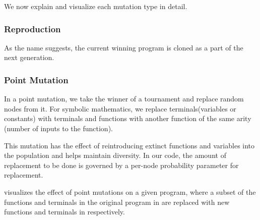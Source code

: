 We now explain and visualize each mutation type in detail.

\subsubsection{Reproduction}
\label{mut:clone}
As the name suggests, the current winning program is cloned as a part of the next generation.
\subsubsection{Point Mutation}
\label{mut:point}
In a point mutation, we take the winner of a tournament and replace random nodes from it. For symbolic mathematics, we replace terminals(variables or constants) with terminals and functions with another function of the same arity (number of inputs to the function).

This mutation has the effect of reintroducing extinct functions and variables into the population and helps maintain diversity\citep{gplearn}. In our code, the amount of replacement to be done is governed by a per-node probability parameter for replacement. 

 visualizes the effect of point mutations on a given program, where a subset of the functions and terminals in the original program in  are replaced with new functions and terminals in  respectively.

